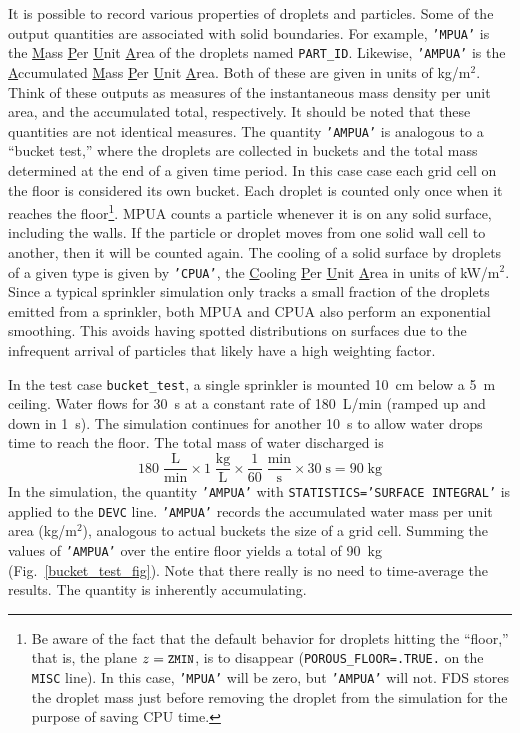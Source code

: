 \documentclass[11pt]{book}
\newcommand{\ct}{\tt\small}
\newcommand{\be}{\begin{equation}}
\newcommand{\ee}{\end{equation}}
\begin{document}
It is possible to record various properties of droplets and particles. Some of the output quantities are associated with solid boundaries. For example,
{\ct 'MPUA'} is the \underline{M}ass \underline{P}er \underline{U}nit \underline{A}rea of the droplets named {\ct PART\_ID}.
Likewise, {\ct 'AMPUA'} is the \underline{A}ccumulated \underline{M}ass \underline{P}er \underline{U}nit \underline{A}rea.
Both of these are given in units of kg/m$^2$. Think of these outputs as measures of the instantaneous mass density per unit area,
and the accumulated total, respectively.  It should be noted that these quantities are not identical measures.  The quantity {\ct 'AMPUA'} is analogous to a ``bucket test,'' where the droplets are collected in buckets and the total mass determined at the end of a given time period.  In this case case each grid cell on the floor is considered its own bucket.  Each droplet is counted only once when it reaches the floor\footnote{Be aware of the fact that the default behavior for droplets hitting the ``floor,'' that is, the plane $z=\hbox{\ct ZMIN}$, is to disappear ({\ct POROUS\_FLOOR=.TRUE.} on the {\ct MISC} line). In this case, {\ct 'MPUA'} will be zero, but {\ct 'AMPUA'} will not. FDS stores the droplet mass just before removing the droplet from the simulation for the purpose of saving CPU time.}. MPUA counts a particle whenever it is on any solid surface, including the walls.  If the particle or droplet moves from one solid wall
cell to another, then it will be counted again.  The cooling of a solid surface by droplets of a
given type is given by {\ct 'CPUA'}, the \underline{C}ooling \underline{P}er \underline{U}nit \underline{A}rea in units of kW/m$^2$.  Since a typical sprinkler simulation only tracks a small fraction of the droplets emitted from a sprinkler, both MPUA and CPUA also perform an exponential smoothing.  This avoids having spotted distributions on surfaces due to the infrequent arrival of particles that likely have a high weighting factor.

In the test case {\ct bucket\_test}, a single sprinkler is
mounted 10~cm below a 5~m ceiling. Water flows for 30~s at a constant
rate of 180~L/min (ramped up and down in 1~s).  The simulation continues for another 10~s to allow
water drops time to reach the floor. The total mass of water discharged is
\be
  \mathrm{ 180 \; \frac{L}{min} \times 1 \; \frac{kg}{L} \times \frac{1}{60} \; \frac{min}{s} \times 30 \; s = 90 \; kg }
\ee
In the simulation, the quantity {\ct 'AMPUA'} with {\ct STATISTICS='SURFACE INTEGRAL'} is applied to the {\ct DEVC} line.
{\ct 'AMPUA'} records the accumulated water mass per unit area (kg/m$^2$), analogous to actual buckets the size of a grid cell.
Summing the values of {\ct 'AMPUA'} over the entire
floor yields a total of 90~kg (Fig.~\ref{bucket_test_fig}). Note that there really is no need to time-average the results. The quantity is inherently accumulating.
\end{document}
